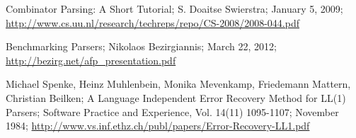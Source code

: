 \begin{thebibliography}{99}
\begin{multicols}{2}
  Combinator Parsing: A Short Tutorial;
  S. Doaitse Swierstra;
  January 5, 2009;
  \url{http://www.cs.uu.nl/research/techreps/repo/CS-2008/2008-044.pdf}
  
	Benchmarking Parsers;
	Nikolaos Bezirgiannis;
	March 22, 2012;
	\url{http://bezirg.net/afp_presentation.pdf}

	Michael Spenke, Heinz Muhlenbein, Monika Mevenkamp, Friedemann Mattern, Christian Beilken;
	A Language Independent Error Recovery Method for LL(1) Parsers;
	Software Practice and Experience, Vol. 14(11) 1095-1107;
	November 1984;
	\url{http://www.vs.inf.ethz.ch/publ/papers/Error-Recovery-LL1.pdf}

\end{multicols}

\end{thebibliography}